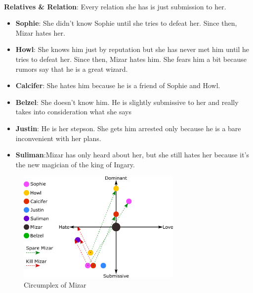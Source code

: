 \\
\textbf{Relatives \& Relation}: Every relation she has is just submission to her.
\begin{itemize}
\item \textbf{Sophie}: She didn’t know Sophie until she tries to defeat her. Since then, Mizar hates her.
\item \textbf{Howl}: She knows him just by reputation but she has never met him until he tries to defeat her. Since then, Mizar hates him. She fears him a bit because rumors say that he is a great wizard.
\item \textbf{Calcifer}: She hates him because he is a friend of Sophie and Howl.
\item \textbf{Belzel}: She doesn’t know him. He is slightly submissive to her and really takes into consideration what she says
\item \textbf{Justin}: He is her stepson. She gets him arrested only because he is a bare  inconvenient with her plans. 
\item \textbf{Suliman}:Mizar has only heard about her, but she still hates her because it’s the new magician of the king of Ingary.
\end{itemize}

\begin{figure}[H]
  \centering
  \includegraphics[width=8cm]{Images/Circumplexes/mizarCircumplex}
  \caption{Circumplex of Mizar}
\end{figure}

